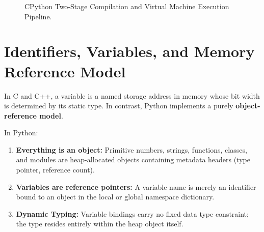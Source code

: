 \begin{figure}[htbp]
\centering
{}
\caption{CPython Two-Stage Compilation and Virtual Machine Execution Pipeline.}
\label{fig:cpython_pipeline}
\end{figure}

\section{Identifiers, Variables, and Memory Reference Model}

In C and C++, a variable is a named storage address in memory whose bit width is determined by its static type. In contrast, Python implements a purely \textbf{object-reference model}.

\begin{theorem}
In Python:
\begin{enumerate}[leftmargin=1.8em, itemsep=3pt]
    \item \textbf{Everything is an object:} Primitive numbers, strings, functions, classes, and modules are heap-allocated objects containing metadata headers (type pointer, reference count).
    \item \textbf{Variables are reference pointers:} A variable name is merely an identifier bound to an object in the local or global namespace dictionary.
    \item \textbf{Dynamic Typing:} Variable bindings carry no fixed data type constraint; the type resides entirely within the heap object itself.
\end{enumerate}
\end{theorem}

